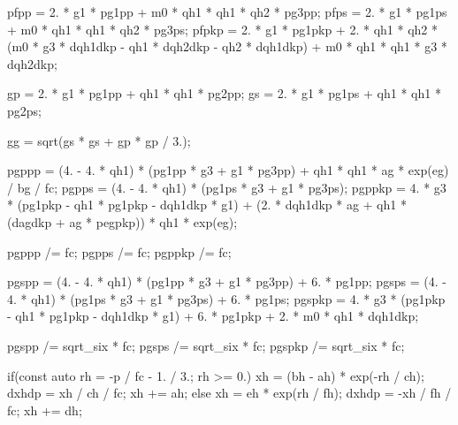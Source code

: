 \begin{cppcode}
{    pfpp = 2. * g1 * pg1pp + m0 * qh1 * qh1 * qh2 * pg3pp;
    pfps = 2. * g1 * pg1ps + m0 * qh1 * qh1 * qh2 * pg3ps;
    pfpkp = 2. * g1 * pg1pkp + 2. * qh1 * qh2 * (m0 * g3 * dqh1dkp - qh1 * dqh2dkp - qh2 * dqh1dkp) + m0 * qh1 * qh1 * g3 * dqh2dkp;

    gp = 2. * g1 * pg1pp + qh1 * qh1 * pg2pp;
    gs = 2. * g1 * pg1ps + qh1 * qh1 * pg2ps;

    gg = sqrt(gs * gs + gp * gp / 3.);

    pgppp = (4. - 4. * qh1) * (pg1pp * g3 + g1 * pg3pp) + qh1 * qh1 * ag * exp(eg) / bg / fc;
    pgpps = (4. - 4. * qh1) * (pg1ps * g3 + g1 * pg3ps);
    pgppkp = 4. * g3 * (pg1pkp - qh1 * pg1pkp - dqh1dkp * g1) + (2. * dqh1dkp * ag + qh1 * (dagdkp + ag * pegpkp)) * qh1 * exp(eg);

    pgppp /= fc;
    pgpps /= fc;
    pgppkp /= fc;

    pgspp = (4. - 4. * qh1) * (pg1pp * g3 + g1 * pg3pp) + 6. * pg1pp;
    pgsps = (4. - 4. * qh1) * (pg1ps * g3 + g1 * pg3ps) + 6. * pg1ps;
    pgspkp = 4. * g3 * (pg1pkp - qh1 * pg1pkp - dqh1dkp * g1) + 6. * pg1pkp + 2. * m0 * qh1 * dqh1dkp;

    pgspp /= sqrt_six * fc;
    pgsps /= sqrt_six * fc;
    pgspkp /= sqrt_six * fc;

    if(const auto rh = -p / fc - 1. / 3.; rh >= 0.) {
        xh = (bh - ah) * exp(-rh / ch);
        dxhdp = xh / ch / fc;
        xh += ah;
    }
    else {
        xh = eh * exp(rh / fh);
        dxhdp = -xh / fh / fc;
        xh += dh;
    }
}
\end{cppcode}

